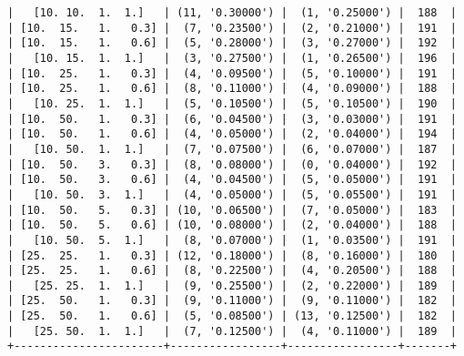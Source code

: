 \documentclass{article}
\begin{document}
\begin{verbatim}
|   [10. 10.  1.  1.]   | (11, '0.30000') |  (1, '0.25000') |  188  |
| [10.  15.   1.   0.3] |  (7, '0.23500') |  (2, '0.21000') |  191  |
| [10.  15.   1.   0.6] |  (5, '0.28000') |  (3, '0.27000') |  192  |
|   [10. 15.  1.  1.]   |  (3, '0.27500') |  (1, '0.26500') |  196  |
| [10.  25.   1.   0.3] |  (4, '0.09500') |  (5, '0.10000') |  191  |
| [10.  25.   1.   0.6] |  (8, '0.11000') |  (4, '0.09000') |  188  |
|   [10. 25.  1.  1.]   |  (5, '0.10500') |  (5, '0.10500') |  190  |
| [10.  50.   1.   0.3] |  (6, '0.04500') |  (3, '0.03000') |  191  |
| [10.  50.   1.   0.6] |  (4, '0.05000') |  (2, '0.04000') |  194  |
|   [10. 50.  1.  1.]   |  (7, '0.07500') |  (6, '0.07000') |  187  |
| [10.  50.   3.   0.3] |  (8, '0.08000') |  (0, '0.04000') |  192  |
| [10.  50.   3.   0.6] |  (4, '0.04500') |  (5, '0.05000') |  191  |
|   [10. 50.  3.  1.]   |  (4, '0.05000') |  (5, '0.05500') |  191  |
| [10.  50.   5.   0.3] | (10, '0.06500') |  (7, '0.05000') |  183  |
| [10.  50.   5.   0.6] | (10, '0.08000') |  (2, '0.04000') |  188  |
|   [10. 50.  5.  1.]   |  (8, '0.07000') |  (1, '0.03500') |  191  |
| [25.  25.   1.   0.3] | (12, '0.18000') |  (8, '0.16000') |  180  |
| [25.  25.   1.   0.6] |  (8, '0.22500') |  (4, '0.20500') |  188  |
|   [25. 25.  1.  1.]   |  (9, '0.25500') |  (2, '0.22000') |  189  |
| [25.  50.   1.   0.3] |  (9, '0.11000') |  (9, '0.11000') |  182  |
| [25.  50.   1.   0.6] |  (5, '0.08500') | (13, '0.12500') |  182  |
|   [25. 50.  1.  1.]   |  (7, '0.12500') |  (4, '0.11000') |  189  |
+-----------------------+-----------------+-----------------+-------+
\end{verbatim}
\end{document}
